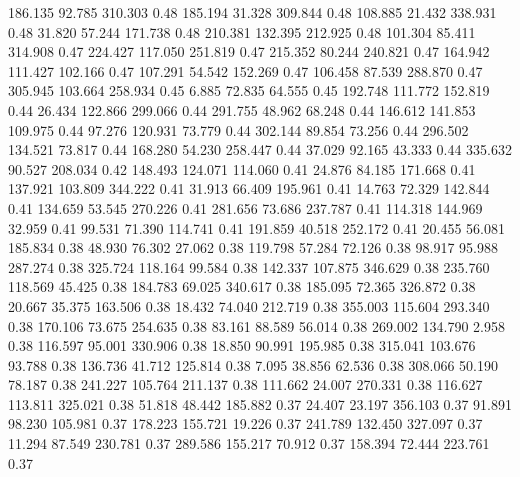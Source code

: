  186.135   92.785  310.303         0.48
 185.194   31.328  309.844         0.48
 108.885   21.432  338.931         0.48
  31.820   57.244  171.738         0.48
 210.381  132.395  212.925         0.48
 101.304   85.411  314.908         0.47
 224.427  117.050  251.819         0.47
 215.352   80.244  240.821         0.47
 164.942  111.427  102.166         0.47
 107.291   54.542  152.269         0.47
 106.458   87.539  288.870         0.47
 305.945  103.664  258.934         0.45
   6.885   72.835   64.555         0.45
 192.748  111.772  152.819         0.44
  26.434  122.866  299.066         0.44
 291.755   48.962   68.248         0.44
 146.612  141.853  109.975         0.44
  97.276  120.931   73.779         0.44
 302.144   89.854   73.256         0.44
 296.502  134.521   73.817         0.44
 168.280   54.230  258.447         0.44
  37.029   92.165   43.333         0.44
 335.632   90.527  208.034         0.42
 148.493  124.071  114.060         0.41
  24.876   84.185  171.668         0.41
 137.921  103.809  344.222         0.41
  31.913   66.409  195.961         0.41
  14.763   72.329  142.844         0.41
 134.659   53.545  270.226         0.41
 281.656   73.686  237.787         0.41
 114.318  144.969   32.959         0.41
  99.531   71.390  114.741         0.41
 191.859   40.518  252.172         0.41
  20.455   56.081  185.834         0.38
  48.930   76.302   27.062         0.38
 119.798   57.284   72.126         0.38
  98.917   95.988  287.274         0.38
 325.724  118.164   99.584         0.38
 142.337  107.875  346.629         0.38
 235.760  118.569   45.425         0.38
 184.783   69.025  340.617         0.38
 185.095   72.365  326.872         0.38
  20.667   35.375  163.506         0.38
  18.432   74.040  212.719         0.38
 355.003  115.604  293.340         0.38
 170.106   73.675  254.635         0.38
  83.161   88.589   56.014         0.38
 269.002  134.790    2.958         0.38
 116.597   95.001  330.906         0.38
  18.850   90.991  195.985         0.38
 315.041  103.676   93.788         0.38
 136.736   41.712  125.814         0.38
   7.095   38.856   62.536         0.38
 308.066   50.190   78.187         0.38
 241.227  105.764  211.137         0.38
 111.662   24.007  270.331         0.38
 116.627  113.811  325.021         0.38
  51.818   48.442  185.882         0.37
  24.407   23.197  356.103         0.37
  91.891   98.230  105.981         0.37
 178.223  155.721   19.226         0.37
 241.789  132.450  327.097         0.37
  11.294   87.549  230.781         0.37
 289.586  155.217   70.912         0.37
 158.394   72.444  223.761         0.37
